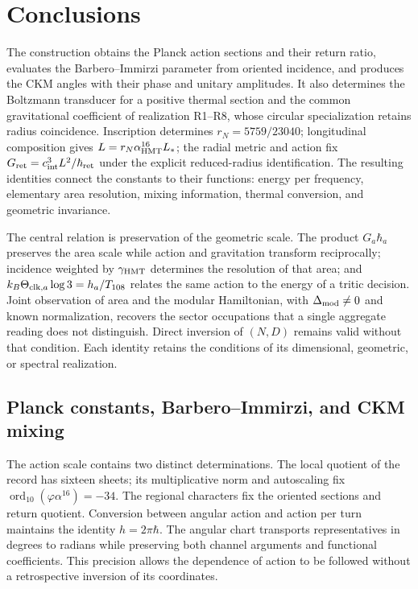 \section{Conclusions}
\label{sec:ii-conclusiones}

The construction obtains the Planck action sections and their return
ratio, evaluates the Barbero--Immirzi parameter from oriented incidence,
and produces the CKM angles with their phase and unitary amplitudes.
It also determines the Boltzmann transducer for a positive thermal
section and the common gravitational coefficient of realization R1--R8,
whose circular specialization retains radius coincidence.
Inscription determines \(r_N=5759/23040\); longitudinal composition
gives \(L=r_N\alpha_{\mathrm{HMT}}^{16}L_*\); the radial metric and action
fix \(G_{\rm ret}=c_{\rm int}^3L^2/\hbar_{\rm ret}\) under the
explicit reduced-radius identification. The resulting identities connect
the constants to their functions: energy per frequency, elementary
area resolution, mixing information, thermal conversion, and geometric
invariance.

The central relation is preservation of the geometric scale.
The product \(G_a\hbar_a\) preserves the area scale while action
and gravitation transform reciprocally; incidence weighted by
\(\gamma_{\mathrm{HMT}}\) determines the resolution of that area; and
\(k_B\Theta_{{\rm clk},a}\log3=h_a/T_{108}\) relates the same action
to the energy of a tritic decision. Joint observation of area and
the modular Hamiltonian, with \(\Delta_{\rm mod}\ne0\) and
known normalization, recovers the sector occupations that a single
aggregate reading does not distinguish. Direct inversion of
\((N,D)\) remains valid without that condition. Each identity retains the
conditions of its dimensional, geometric, or spectral realization.

\subsection{Planck constants, Barbero--Immirzi, and CKM mixing}

The action scale contains two distinct determinations. The
local quotient of the record has sixteen sheets; its multiplicative norm
and autoscaling fix \(\operatorname{ord}_{10}(\varphi\alpha^{16})=-34\). The regional characters fix the oriented sections
and return quotient. Conversion between angular action and action
per turn maintains the identity \(h=2\pi\hbar\). The angular chart
transports representatives in degrees to radians while preserving both
channel arguments and functional coefficients.
This precision allows the dependence of action to be followed without a
retrospective inversion of its coordinates.

